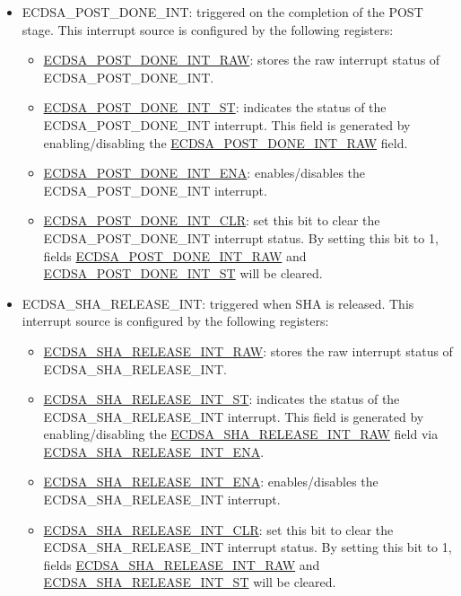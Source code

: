 \documentclass[main\_\_EN.tex]{subfiles}
\begin{document}
\begin{itemize}
\begin{itemize}
	      \end{itemize}
	\item \label{int:ECDSAPOSTDONEINT}ECDSA\_POST\_DONE\_INT: triggered on the completion of the POST stage. This interrupt source is configured by the following registers:
	      \begin{itemize}
		      \item \hyperref[fielddesc:ECDSAPOSTDONEINTRAW]{ECDSA\_POST\_DONE\_INT\_RAW}: stores the raw interrupt status of ECDSA\_POST\_DONE\_INT.
		      \item \hyperref[fielddesc:ECDSAPOSTDONEINTST]{ECDSA\_POST\_DONE\_INT\_ST}: indicates the status of the ECDSA\_POST\_DONE\_INT interrupt. This field is generated by enabling/disabling the \hyperref[fielddesc:ECDSAPOSTDONEINTRAW]{ECDSA\_POST\_DONE\_INT\_RAW} field.
		      \item \hyperref[fielddesc:ECDSAPOSTDONEINTENA]{ECDSA\_POST\_DONE\_INT\_ENA}: enables/disables the ECDSA\_POST\_DONE\_INT interrupt.
		      \item \hyperref[fielddesc:ECDSAPOSTDONEINTCLR]{ECDSA\_POST\_DONE\_INT\_CLR}: set this bit to clear the ECDSA\_POST\_DONE\_INT interrupt status. By setting this bit to 1, fields \hyperref[fielddesc:ECDSAPOSTDONEINTRAW]{ECDSA\_POST\_DONE\_INT\_RAW} and  \hyperref[fielddesc:ECDSAPOSTDONEINTST]{ECDSA\_POST\_DONE\_INT\_ST} will be cleared.
	      \end{itemize}
	\item \label{int:ECDSASHARELEASEINT}ECDSA\_SHA\_RELEASE\_INT: triggered when SHA is released. This interrupt source is configured by the following registers:
	      \begin{itemize}
		      \item \hyperref[fielddesc:ECDSASHARELEASEINTRAW]{ECDSA\_SHA\_RELEASE\_INT\_RAW}: stores the raw interrupt status of ECDSA\_SHA\_RELEASE\_INT.
		      \item \hyperref[fielddesc:ECDSASHARELEASEINTST]{ECDSA\_SHA\_RELEASE\_INT\_ST}: indicates the status of the ECDSA\_SHA\_RELEASE\_INT interrupt. This field is generated by enabling/disabling the \hyperref[fielddesc:ECDSASHARELEASEINTRAW]{ECDSA\_SHA\_RELEASE\_INT\_RAW} field via \hyperref[fielddesc:ECDSASHARELEASEINTENA]{ECDSA\_SHA\_RELEASE\_INT\_ENA}.
		      \item \hyperref[fielddesc:ECDSASHARELEASEINTENA]{ECDSA\_SHA\_RELEASE\_INT\_ENA}: enables/disables the ECDSA\_SHA\_RELEASE\_INT interrupt.
		      \item \hyperref[fielddesc:ECDSASHARELEASEINTCLR]{ECDSA\_SHA\_RELEASE\_INT\_CLR}: set this bit to clear the ECDSA\_SHA\_RELEASE\_INT interrupt status. By setting this bit to 1, fields \hyperref[fielddesc:ECDSASHARELEASEINTRAW]{ECDSA\_SHA\_RELEASE\_INT\_RAW} and  \hyperref[fielddesc:ECDSASHARELEASEINTST]{ECDSA\_SHA\_RELEASE\_INT\_ST} will be cleared.
	      \end{itemize}
\end{itemize}
\end{document}
